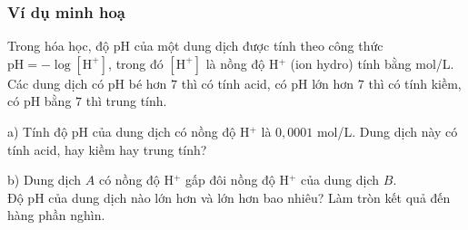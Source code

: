 \subsubsection{Ví dụ minh hoạ}
\begin{vd}%
	Trong hóa học, độ  pH  của một dung dịch được tính theo công thức $\text{pH}=-\log[\text{H}^+] $, trong đó $ [\text{H}^+] $ là nồng độ  H$^+ $ (ion hydro) tính bằng mol/L. Các dung dịch có  pH  bé hơn $ 7 $ thì có tính acid, có pH  lớn hơn $ 7 $ thì có tính kiềm, có  pH  bằng $ 7 $ thì trung tính.
	\begin{listEX}[1]
		\item[a)] Tính độ  pH  của dung dịch có nồng độ H$^+ $ là $ 0{,}0001 $ mol/L. Dung dịch này có tính acid, hay kiềm hay trung tính?
		\item[b)] Dung dịch $ A $ có nồng độ  H$^+ $ gấp đôi nồng độ  H$^+ $ của dung dịch $ B $.\\
		Độ pH  của dung dịch nào lớn hơn và lớn hơn bao nhiêu? Làm tròn kết quả đến hàng phần nghìn.
	\end{listEX}
\end{vd}

